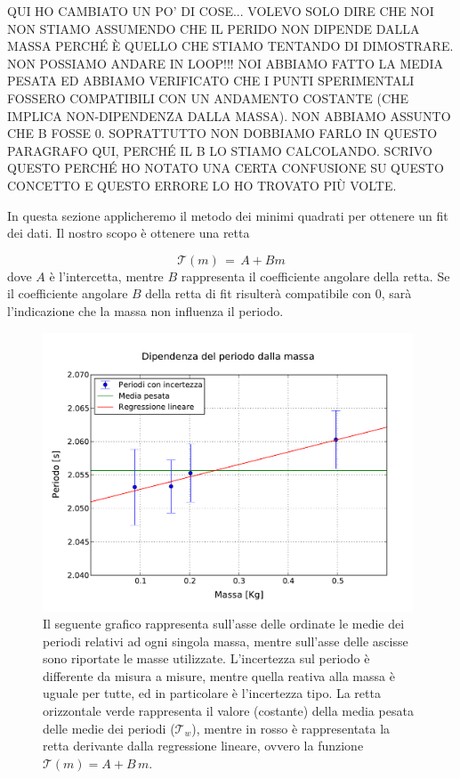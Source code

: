 QUI HO CAMBIATO UN PO' DI COSE... VOLEVO SOLO DIRE CHE NOI NON STIAMO ASSUMENDO CHE IL PERIDO 
NON DIPENDE DALLA MASSA PERCHÉ È QUELLO CHE STIAMO TENTANDO DI DIMOSTRARE. NON POSSIAMO ANDARE IN LOOP!!!
NOI ABBIAMO FATTO LA MEDIA PESATA ED ABBIAMO VERIFICATO CHE I PUNTI SPERIMENTALI FOSSERO
COMPATIBILI CON UN ANDAMENTO COSTANTE (CHE IMPLICA NON-DIPENDENZA DALLA MASSA). NON ABBIAMO ASSUNTO CHE
B FOSSE 0. SOPRATTUTTO NON DOBBIAMO FARLO IN QUESTO PARAGRAFO QUI, PERCHÉ IL B LO STIAMO CALCOLANDO.
SCRIVO QUESTO PERCHÉ HO NOTATO UNA CERTA CONFUSIONE SU QUESTO CONCETTO E QUESTO ERRORE LO HO TROVATO PIÙ VOLTE.

In questa sezione applicheremo il metodo dei minimi quadrati per ottenere un fit dei dati.
Il nostro scopo è ottenere una retta

\begin{equation}
	\mathcal{T}(m) \,=\, A + B m 
\end{equation}
%
dove $A$ è l'intercetta, mentre $B$ rappresenta il coefficiente angolare della retta. Se il coefficiente angolare $B$ della 
retta di fit risulterà compatibile con 0, sarà l'indicazione che la massa non influenza il periodo. 

\begin{figure}
    \centering
    \includegraphics[width=110mm]{immagini/masse.pdf}
    \caption{Il seguente grafico rappresenta sull'asse delle ordinate le medie dei periodi relativi ad ogni
        singola massa, mentre sull'asse delle ascisse sono riportate le masse utilizzate. L'incertezza sul periodo
        è differente da misura a misure, mentre quella reativa alla massa è uguale per tutte, ed in particolare è
        l'incertezza tipo. La retta orizzontale verde rappresenta il valore (costante) della media pesata delle medie
        dei periodi ($\mathcal{T}_w$), mentre in rosso è rappresentata la retta derivante dalla regressione lineare,
        ovvero la funzione $\mathcal{T}(m) = A + B\,m$.}
    \label{fig:masse_periodi}
\end{figure}

